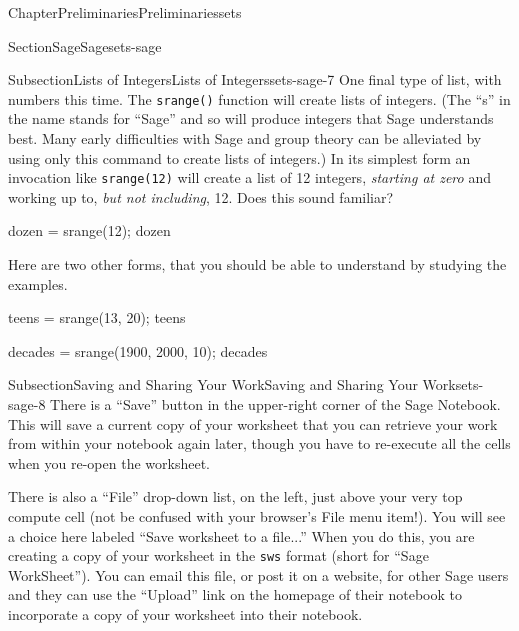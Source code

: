 \documentclass[oneside,10pt,]{book}
\newcommand{\mono}[1]{\texttt{#1}}
\numberwithin{equation}{section}
\begin{document}
\begin{chapterptx}{Chapter}{Preliminaries}{}{Preliminaries}{}{}{sets}
\begin{sectionptx}{Section}{Sage}{}{Sage}{}{}{sets-sage}
\begin{subsectionptx}{Subsection}{Lists of Integers}{}{Lists of Integers}{}{}{sets-sage-7}
One final type of list, with numbers this time.  The \mono{srange()} function will create lists of integers.  (The ``s'' in the name stands for ``Sage'' and so will produce integers that Sage understands best.  Many early difficulties with Sage and group theory can be alleviated by using only this command to create lists of integers.)  In its simplest form an invocation like \mono{srange(12)} will create a list of 12 integers, \emph{starting at zero} and working up to, \emph{but not including}, 12.  Does this sound familiar?%
\begin{sageinput}
dozen = srange(12); dozen
\end{sageinput}
\begin{sageoutput}
[0, 1, 2, 3, 4, 5, 6, 7, 8, 9, 10, 11]
\end{sageoutput}
Here are two other forms, that you should be able to understand by studying the examples.%
\begin{sageinput}
teens = srange(13, 20); teens
\end{sageinput}
\begin{sageoutput}
[13, 14, 15, 16, 17, 18, 19]
\end{sageoutput}
\begin{sageinput}
decades = srange(1900, 2000, 10); decades
\end{sageinput}
\begin{sageoutput}
[1900, 1910, 1920, 1930, 1940, 1950, 1960, 1970, 1980, 1990]
\end{sageoutput}
\end{subsectionptx}
%
%
\typeout{************************************************}
\typeout{************************************************}
%
\begin{subsectionptx}{Subsection}{Saving and Sharing Your Work}{}{Saving and Sharing Your Work}{}{}{sets-sage-8}
There is a ``Save'' button in the upper-right corner of the Sage Notebook.  This will save a current copy of your worksheet that you can retrieve your work from within your notebook again later, though you have to re-execute all the cells when you re-open the worksheet.%
\par
There is also a ``File'' drop-down list, on the left, just above your very top compute cell (not be confused with your browser's File menu item!).  You will see a choice here labeled  ``Save worksheet to a file...''  When you do this, you are creating a copy of your worksheet in the \mono{sws} format (short for ``Sage WorkSheet'').  You can email this file, or post it on a website, for other Sage users and they can use the ``Upload'' link on the homepage of their notebook to incorporate a copy of your worksheet into their notebook.%

\end{subsectionptx}
\end{sectionptx}
\end{chapterptx}
\end{document}
